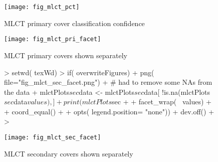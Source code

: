 \begin{figure} 
\begin{center}
  
\begin{Schunk}
\end{Schunk}

\texttt{[image: fig\_mlct\_pct]}
\end{center} 
\caption{MLCT primary cover classification confidence} 
\label{fig:mlct_pct} 
\end{figure} 



\begin{figure} 
\begin{center}
  
\begin{Schunk}
\end{Schunk}

\texttt{[image: fig\_mlct\_pri\_facet]}
\end{center} 
\caption{MLCT primary covers shown separately} 
\label{fig:mlct_pri_reclass} 
\end{figure} 


\begin{figure} 
\begin{center}
  
\begin{Schunk}
\begin{Sinput}
> setwd( texWd)
> if( overwriteFigures) {
+   png( file="fig_mlct_sec_facet.png")
+                                         # had to remove some NAs from the data
+   mlctPlots$sec$data <- mlctPlots$sec$data[ !is.na(mlctPlots$sec$data$values),]
+   print( mlctPlots$sec + 
+         facet_wrap(~ values) + 
+         coord_equal() +
+         opts( legend.position= "none"))
+   dev.off()
+ }
> 
\end{Sinput}
\end{Schunk}

\texttt{[image: fig\_mlct\_sec\_facet]}
\end{center} 
\caption{MLCT secondary covers shown separately} 
\label{fig:mlct_pri_reclass} 
\end{figure} 


